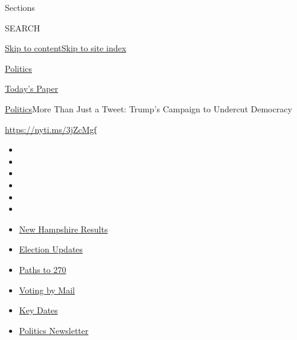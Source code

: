 Sections

SEARCH

\protect\hyperlink{site-content}{Skip to
content}\protect\hyperlink{site-index}{Skip to site index}

\href{https://www.nytimes3xbfgragh.onion/section/politics}{Politics}

\href{https://myaccount.nytimes3xbfgragh.onion/auth/login?response_type=cookie\&client_id=vi}{}

\href{https://www.nytimes3xbfgragh.onion/section/todayspaper}{Today's
Paper}

\href{/section/politics}{Politics}\textbar{}More Than Just a Tweet:
Trump's Campaign to Undercut Democracy

\url{https://nyti.ms/3jZcMgf}

\begin{itemize}
\item
\item
\item
\item
\item
\item
\end{itemize}

\begin{itemize}
\item
  \href{https://www.nytimes3xbfgragh.onion/interactive/2020/09/08/us/elections/results-new-hampshire-primary-elections.html?action=click\&pgtype=Article\&state=default\&region=TOP_BANNER\&context=storylines_menu}{New
  Hampshire Results}
\item
  \href{https://www.nytimes3xbfgragh.onion/live/2020/09/08/us/trump-vs-biden?action=click\&pgtype=Article\&state=default\&region=TOP_BANNER\&context=storylines_menu}{Election
  Updates}
\item
  \href{https://www.nytimes3xbfgragh.onion/interactive/2020/us/elections/election-states-biden-trump.html?action=click\&pgtype=Article\&state=default\&region=TOP_BANNER\&context=storylines_menu}{Paths
  to 270}
\item
  \href{https://www.nytimes3xbfgragh.onion/interactive/2020/08/31/us/politics/vote-by-mail-deadlines.html?action=click\&pgtype=Article\&state=default\&region=TOP_BANNER\&context=storylines_menu}{Voting
  by Mail}
\item
  \href{https://www.nytimes3xbfgragh.onion/interactive/2019/us/elections/2020-presidential-election-calendar.html?action=click\&pgtype=Article\&state=default\&region=TOP_BANNER\&context=storylines_menu}{Key
  Dates}
\item
  \href{https://www.nytimes3xbfgragh.onion/newsletters/politics?action=click\&pgtype=Article\&state=default\&region=TOP_BANNER\&context=storylines_menu}{Politics
  Newsletter}
\end{itemize}

